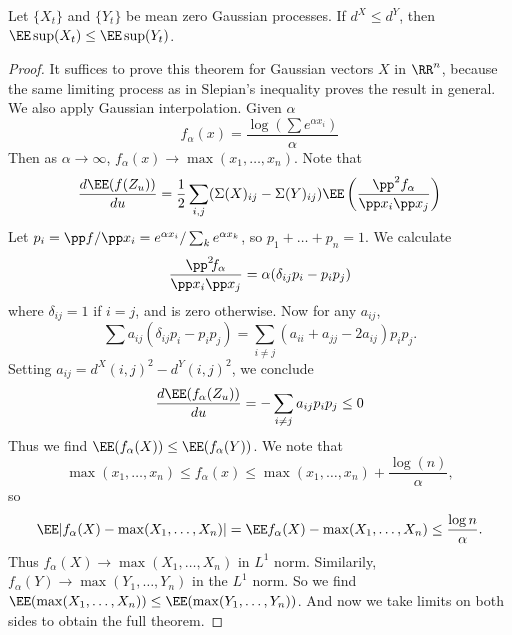 \begin{theorem}
    Let $\{ X_t \}$ and $\{ Y_t \}$ be mean zero Gaussian processes. If $d^X \leq d^Y$, then $\EE \sup(X_t) \leq \EE \sup(Y_t)$.
\end{theorem}
\begin{proof}
    It suffices to prove this theorem for Gaussian vectors $X$ in $\RR^n$, because the same limiting process as in Slepian's inequality proves the result in general. We also apply Gaussian interpolation. Given $\alpha$
    \[ f_\alpha(x) = \frac{\log \left( \sum e^{\alpha x_i} \right)}{\alpha} \]
    Then as $\alpha \to \infty$, $f_\alpha(x) \to \max(x_1, \dots, x_n)$. Note that
    \[ \frac{d \EE(f(Z_u))}{du} = \frac{1}{2} \sum_{i,j} (\Sigma(X)_{ij} - \Sigma(Y)_{ij}) \EE \left( \frac{\pp^2 f_\alpha}{\pp x_i \pp x_j} \right) \]
    Let $p_i = \pp f / \pp x_i = e^{\alpha x_i} / \sum_k e^{\alpha x_k}$, so $p_1 + \dots + p_n = 1$. We calculate
    \[ \frac{\pp^2 \hspace{-0.2em} f_\alpha}{\pp x_i \pp x_j} = \alpha(\delta_{ij} p_i - p_i p_j) \]
    where $\delta_{ij} = 1$ if $i = j$, and is zero otherwise. Now for any $a_{ij}$,
    \[ \sum a_{ij}(\delta_{ij} p_i - p_i p_j) = \sum_{i \neq j} (a_{ii} + a_{jj} - 2 a_{ij}) p_i p_j. \]
    Setting $a_{ij} = d^X(i,j)^2 - d^Y(i,j)^2$, we conclude
    \[ \frac{d \EE(f_\alpha(Z_u))}{du} = - \sum_{i \neq j} a_{ij} p_i p_j \leq 0 \]
    Thus we find $\EE(f_\alpha(X)) \leq \EE(f_\alpha(Y))$. We note that
    \[ \max(x_1, \dots, x_n) \leq f_\alpha(x) \leq \max(x_1, \dots, x_n) + \frac{\log(n)}{\alpha}, \]
    so
    \[ \EE |f_\alpha(X) - \max(X_1, \dots, X_n)|  = \EE f_\alpha(X) - \max(X_1, \dots, X_n) \leq \frac{\log n}{\alpha}. \]
    Thus $f_\alpha(X) \to \max(X_1, \dots, X_n)$ in $L^1$ norm. Similarily, $f_\alpha(Y) \to \max(Y_1, \dots, Y_n)$ in the $L^1$ norm. So we find $\EE(\max(X_1, \dots, X_n)) \leq \EE(\max(Y_1, \dots, Y_n))$. And now we take limits on both sides to obtain the full theorem.
\end{proof}

